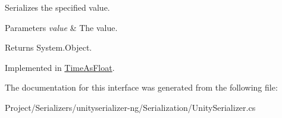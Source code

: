 Serializes the specified value. 


\begin{DoxyParams}{Parameters}
{\em value} & The value.\\
\hline
\end{DoxyParams}
\begin{DoxyReturn}{Returns}
System.\+Object.
\end{DoxyReturn}


Implemented in \hyperlink{class_time_as_float_a2c67f320572b03fa73fbdd206d7fe65f}{Time\+As\+Float}.



The documentation for this interface was generated from the following file\+:\begin{DoxyCompactItemize}
\item 
Project/\+Serializers/unityserializer-\/ng/\+Serialization/Unity\+Serializer.\+cs\end{DoxyCompactItemize}
